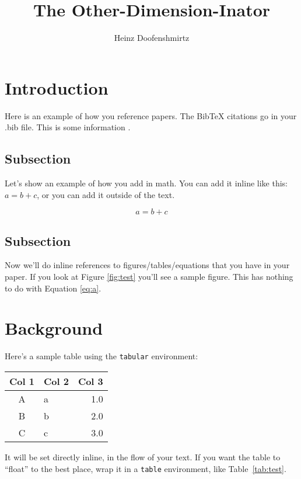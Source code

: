 \documentclass{ndreureport}
\author{Heinz Doofenshmirtz}
\title{The Other-Dimension-Inator}
\begin{document}
\maketitle


\begin{abstract}
    \lipsum[1]
\end{abstract}


\section{Introduction}

Here is an example of how you reference papers. The BibTeX citations go in your
.bib file. This is some information \cite{sample2021}.

\subsection{Subsection}

\lipsum[2]

Let's show an example of how you add in math. You can add it inline like this:
$a = b + c$, or you can add it outside of the text.

\begin{equation}
    a = b + c
    \label{eq:a}
\end{equation}

\subsection{Subsection}

\lipsum[3]

Now we'll do inline references to figures/tables/equations that you have in your
paper. If you look at Figure \ref{fig:test} you'll see a sample figure. This has
nothing to do with Equation \ref{eq:a}.

\section{Background}

Here's a sample table using the \texttt{tabular} environment:
\begin{center}
    \begin{tabular}{c|l|r}
        Col 1 & Col 2 & Col 3 \\ \hline
        A & a & 1.0 \\
        B & b & 2.0 \\
        C & c & 3.0
    \end{tabular}
\end{center}
It will be set directly inline, in the flow of your text. If you want the table
to ``float'' to the best place, wrap it in a \texttt{table} environment, like
Table~\ref{tab:test}.
\end{document}
